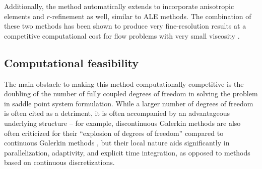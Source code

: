 Additionally, the method automatically extends to incorporate anisotropic elements and $r$-refinement as well, similar to ALE methods.  The combination of these two methods has been shown to produce very fine-resolution results at a competitive computational cost for flow problems with very small viscosity \cite{AlmeidaAnisotropy}.  

\subsection{Computational feasibility}

The main obstacle to making this method computationally competitive is the doubling of the number of fully coupled degrees of freedom in solving the problem in saddle point system formulation.  While a larger number of degrees of freedom is often cited as a detriment, it is often accompanied by an advantageous underlying structure -- for example, discontinuous Galerkin methods are also often criticized for their ``explosion of degrees of freedom'' compared to continuous Galerkin methods \cite{cottrell2007isogeometric}, but their local nature aids significantly in parallelization, adaptivity, and explicit time integration, as opposed to methods based on continuous discretizations.  

